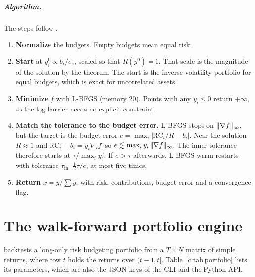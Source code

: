 \paragraph{Algorithm.} The steps follow .
\begin{enumerate}
  \item \textbf{Normalize} the budgets. Empty budgets mean equal risk.
  \item \textbf{Start} at $y^0_i\propto b_i/\sigma_i$, scaled so that $R(y^0)=1$. That
        scale is the magnitude of the solution by the theorem. The start is the
        inverse-volatility portfolio for equal budgets, which is exact for uncorrelated
        assets.
  \item \textbf{Minimize} $f$ with L-BFGS (memory 20). Points with any $y_i\le0$ return
        $+\infty$, so the log barrier needs no explicit constraint.
  \item \textbf{Match the tolerance to the budget error.} L-BFGS stops on
        $\lVert \nabla f\rVert_\infty$, but the target is the budget error
        $e=\max_i|\mathrm{RC}_i/R-b_i|$. Near the solution $R\approx1$ and
        $\mathrm{RC}_i-b_i=y_i\nabla_if$, so $e\lesssim\max_iy_i\,\lVert \nabla f\rVert_\infty$.
        The inner tolerance therefore starts at $\tau/\max_iy^0_i$. If $e>\tau$ afterwards,
        L-BFGS warm-restarts with tolerance $\tau_{\text{in}}\cdot\tfrac12\tau/e$, at most five
        times.
  \item \textbf{Return} $x=y/\sum y$, with risk, contributions, budget error and a
        convergence flag.
\end{enumerate}
\begin{codepointers}
\end{codepointers}

\chapter{The walk-forward portfolio engine}\label{c:sec:engine}

 backtests a long-only risk budgeting portfolio from a
$T\times N$ matrix of simple returns, where row $t$ holds the returns over $(t-1,t]$.
Table~\ref{c:tab:portfolio} lists its parameters, which are also the JSON keys of the CLI and
the Python API.

